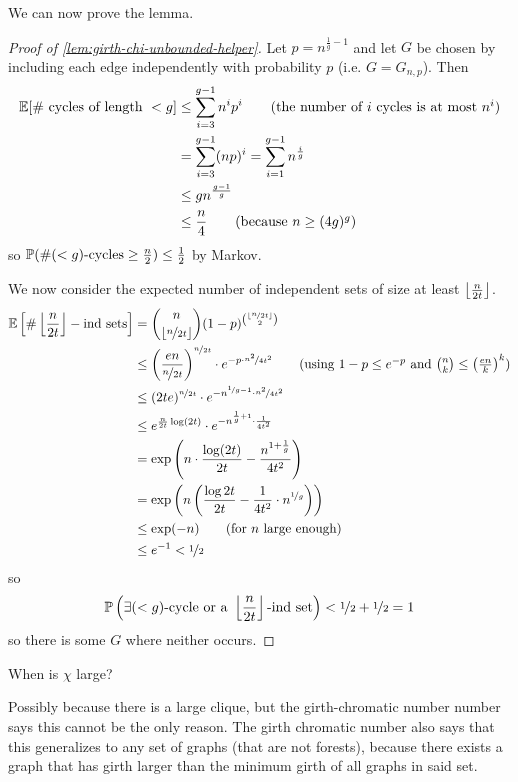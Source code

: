 \documentclass[main.tex]{subfiles}
\begin{document}
We can now prove the lemma.
\begin{proof}[Proof of \th\ref{lem:girth-chi-unbounded-helper}]
  Let $p = n^{\frac 1 g - 1}$ and let $G$ be chosen by including each edge
  independently with probability $p$ (i.e. $G = G_{n,p}$).
  Then
  \begin{align*}
    \mathbb E[\#\text{ cycles of length }<g]
    &\leq\sum_{i=3}^{g-1} n^i p^i \tag{the number of $i$ cycles is at most $n^i$} \\
    &= \sum_{i=3}^{g-1}(np)^i = \sum_{i=1}^{g-1}n^{\frac i g} \\
    &\leq gn^{\frac{g-1}{g}} \\
    &\leq\frac n 4 \tag{because $n\geq (4g)^g$}
  \end{align*}
  so $\mathbb P(\#(<g)\text{-cycles}\geq\frac n 2)\leq\frac{1}{2}$ by Markov.

  We now consider the expected number of independent sets of size at least
  $\left\lfloor \frac{n}{2t} \right\rfloor$.
  \begin{align*}
    \bE\left[\#\floor{\frac{n}{2t}}-\text{ind sets}\right]
    &= \binom{n}{\floor{\nicefrac{n}{2t}}}(1-p)^{\binom{\floor{\nicefrac{n}{2t}}}{2}}\\
    &\leq\left(\frac{en}{\nicefrac{n}{2t}}\right)^{\nicefrac{n}{2t}}
      \cdot e^{-p\cdot\nicefrac{n^2}{4t^2}}
    \tag{using $1-p\leq e^{-p}$ and $\binom{n}{k}\leq\left(\frac{en}{k}\right)^k$} \\
    &\leq (2te)^{\nicefrac{n}{2t}}\cdot
        e^{-n^{\nicefrac{1}{g}-1}\cdot\nicefrac{n^2}{4t^2}} \\
    &\leq e^{\frac{n}{2t}\log(2t)}\cdot e^{-n^{\frac 1 g + 1}\cdot\frac{1}{4t^2}} \\
    &=\exp\left(n\cdot\frac{\log(2t)}{2t} - \frac{n^{1+\frac 1 g}}{4t^2}\right) \\
    &=\exp\left(n\left(\frac{\log 2t}{2t} - \frac{1}{4t^2}\cdot n^{\nicefrac 1 g}\right)\right) \\
    &\leq\exp(-n) \tag{for $n$ large enough} \\
    &\leq e\inv < \nicefrac 1 2
  \end{align*}
  so
  \[
    \mathbb P\left(\exists(<g)\text{-cycle or a }\left\lfloor \frac{n}{2t} \right\rfloor\text{-ind set}\right)
    < \nicefrac 1 2 + \nicefrac 1 2 = 1
  \]
  so there is some $G$ where neither occurs.
\end{proof}
\begin{question*}
  When is $\chi$ large?
\end{question*}
Possibly because there is a large clique, but the girth-chromatic number
number says this cannot be the only reason.
The girth chromatic number also says that this generalizes to any set of
graphs (that are not forests), because there exists a graph that has
girth larger than the minimum girth of all graphs in said set.
\end{document}
